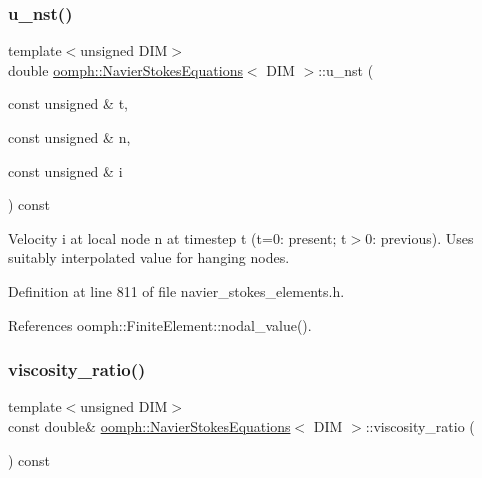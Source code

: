 \mbox{\label{classoomph_1_1NavierStokesEquations_ac7e340865e2838e2de5443699f0f7ae8}} 
\subsubsection{\texorpdfstring{u\+\_\+nst()}{u\_nst()}\hspace{0.1cm}{\footnotesize\ttfamily [2/2]}}
{\footnotesize\ttfamily template$<$unsigned D\+IM$>$ \\
double \hyperlink{classoomph_1_1NavierStokesEquations}{oomph\+::\+Navier\+Stokes\+Equations}$<$ D\+IM $>$\+::u\+\_\+nst (\begin{DoxyParamCaption}\item[{const unsigned \&}]{t,  }\item[{const unsigned \&}]{n,  }\item[{const unsigned \&}]{i }\end{DoxyParamCaption}) const\hspace{0.3cm}{\ttfamily [inline]}}



Velocity i at local node n at timestep t (t=0\+: present; t$>$0\+: previous). Uses suitably interpolated value for hanging nodes. 



Definition at line 811 of file navier\+\_\+stokes\+\_\+elements.\+h.



References oomph\+::\+Finite\+Element\+::nodal\+\_\+value().

\mbox{\label{classoomph_1_1NavierStokesEquations_aa250f97466ad1729a5c75c5cd04b0546}} 
\subsubsection{\texorpdfstring{viscosity\+\_\+ratio()}{viscosity\_ratio()}}
{\footnotesize\ttfamily template$<$unsigned D\+IM$>$ \\
const double\& \hyperlink{classoomph_1_1NavierStokesEquations}{oomph\+::\+Navier\+Stokes\+Equations}$<$ D\+IM $>$\+::viscosity\+\_\+ratio (\begin{DoxyParamCaption}{ }\end{DoxyParamCaption}) const\hspace{0.3cm}{\ttfamily [inline]}}



